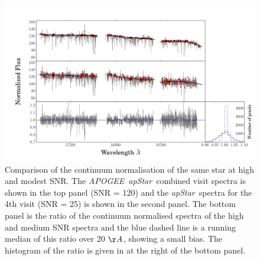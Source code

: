 \documentclass[12pt, preprint]{aastex}
\newcommand{\apogee}{\textsl{APOGEE}}
\newcommand{\apstar}{\textsl{apStar}}
\begin{document}
 \begin{figure}[!h]
  \includegraphics[width=\hsize]{./plots/SNR_continuum6.png}
  \caption{Comparison of the continuum normalisation of the same star at high and modest SNR. The \apogee\ \apstar\ combined visit spectra is shown in the top panel (SNR = 120) and the \apstar\ spectra for the 4th visit (SNR = 25) is shown in the second panel. The bottom panel is the ratio of the continuum normalised spectra of the high and medium SNR spectra and the blue dashed line is a running median of this ratio over 20 $\AA$, showing a small bias. The histogram of the ratio is given in at the right of the bottom panel.}
\label{fig:lowsnr}
\end{figure}
\end{document}
